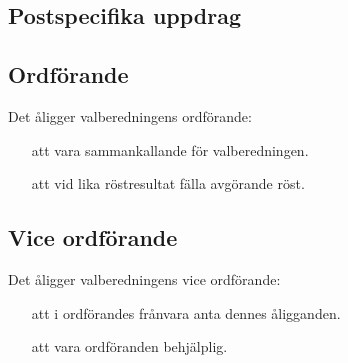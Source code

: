 \documentclass[a4paper]{article}
\begin{document}
\begin{foreningenv}{\forening{}}
    \section{Postspecifika uppdrag}
    \subsection{Ordförande}
    Det åligger valberedningens ordförande:
    \begin{itemize}
        \item[att] vara sammankallande för valberedningen.
        \item[att] vid lika röstresultat fälla avgörande röst.
    \end{itemize}
    
    \subsection{Vice ordförande}
    Det åligger valberedningens vice ordförande:
    \begin{itemize}
        \item[att] i ordförandes frånvara anta dennes åligganden.
        \item[att] vara ordföranden behjälplig.
    \end{itemize}
\end{foreningenv}
\end{document}

